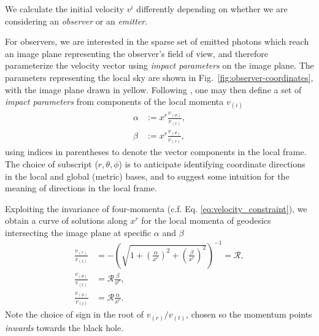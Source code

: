 \documentclass[fleqn,usenatbib]{mnras}
\begin{document}
We calculate the initial velocity $v^i$ differently depending on whether we are
considering an \emph{observer} or an \emph{emitter}.

For observers, we are interested in the sparse set of emitted photons which
reach an image plane representing the observer's field of view, and therefore
parameterize the velocity vector using \emph{impact parameters} on the image
plane. The parameters representing the local sky are shown in
Fig.~\ref{fig:observer-coordinates}, with the image plane drawn in yellow.
Following \cite{cunningham_optical_1973}, one may then define a set of
\emph{impact
parameters} from components of the local momenta $v_{(i)}$
\begin{align}
    \alpha &:=  x^r \frac{v_{(\phi)}}{v_{(r)}}, \\
    \beta &:= x^r \frac{v_{(\theta)}}{v_{(r)}},
\end{align}
using indices in parentheses to denote the vector components in the local
frame. The choice of subscript ($r, \theta, \phi$) is to anticipate identifying
coordinate directions in the local and global (metric) bases, and to suggest
some intuition for the meaning of directions in the local frame.

Exploiting the invariance of four-momenta (c.f. Eq.
\eqref{eq:velocity_constraint}), we obtain a curve of solutions along $x^r$ for
the local momenta of geodesics intersecting the image plane at specific
$\alpha$ and
$\beta$
\begin{align}
    \frac{v_{(r)}}{v_{(t)}} &= -\left( \sqrt{1 + \left(\frac{\alpha}{x^r}\right)^2 + \left(\frac{\beta}{x^r}\right)^2} \right)^{-1} = \mathscr{R}, \\
    \frac{v_{(\theta)}}{v_{(t)}} &= \mathscr{R} \frac{\beta}{x^r}, \\
    \frac{v_{(\phi)}}{v_{(t)}} &= \mathscr{R} \frac{\alpha}{x^r}.
\end{align}
Note the choice of sign in the root of $v_{(r)} / v_{(t)}$, chosen so the
momentum points \emph{inwards} towards the black hole.
\end{document}

